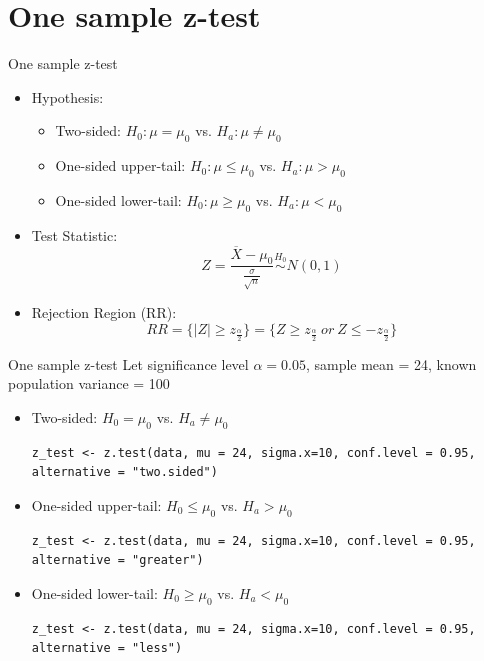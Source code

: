 \documentclass[aspectratio=169]{beamer}
\begin{document}
\section{One sample z-test}
\begin{frame}{One sample z-test}
\begin{itemize}
    \item Hypothesis: 
    \begin{itemize}
        \item Two-sided: $H_0: \mu = \mu_0$ vs. $H_a: \mu \neq \mu_0$ 
        \item One-sided upper-tail: $H_0: \mu \leq \mu_0$ vs. $H_a: \mu > \mu_0$
        \item One-sided lower-tail: $H_0: \mu \geq \mu_0$ vs. $H_a: \mu < \mu_0$
    \end{itemize}
    \item Test Statistic:
    \[
    Z = \frac{\overline{X}-\mu_0}{\frac{\sigma}{\sqrt{n}}} \overset{H_0}{\sim} N(0,1)
    \]
    \item Rejection Region (RR):
    \[
    RR = \{\lvert Z \rvert \ge z_{\frac{\alpha}{2}}\} = \{Z \ge z_{\frac{\alpha}{2}}\ or\ Z \le -z_{\frac{\alpha}{2}}\}
    \]
\end{itemize}
\end{frame}

\begin{frame}[fragile]{One sample z-test}
Let significance level $\alpha = 0.05$, sample mean = 24, known population variance = 100
\begin{itemize}
    \item Two-sided: $H_0 = \mu_0$ vs. $H_a\neq \mu_0$ 
\begin{lstlisting}
z_test <- z.test(data, mu = 24, sigma.x=10, conf.level = 0.95, alternative = "two.sided")
\end{lstlisting}
    \item One-sided upper-tail: $H_0 \leq \mu_0$ vs. $H_a > \mu_0$
\begin{lstlisting}
z_test <- z.test(data, mu = 24, sigma.x=10, conf.level = 0.95, alternative = "greater")
\end{lstlisting}
    \item One-sided lower-tail: $H_0 \ge \mu_0$ vs. $H_a < \mu_0$
\begin{lstlisting}
z_test <- z.test(data, mu = 24, sigma.x=10, conf.level = 0.95, alternative = "less")
\end{lstlisting}
\end{itemize}
\end{frame}
\end{document}
